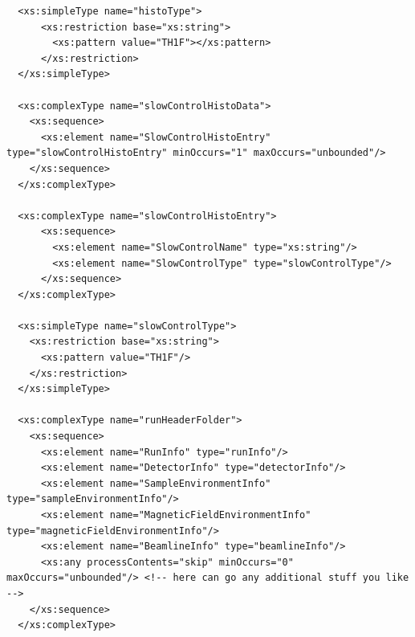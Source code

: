 \documentclass[twoside]{article}
\begin{document}
\begin{shaded}
\begin{small}
\begin{verbatim}
  <xs:simpleType name="histoType">
      <xs:restriction base="xs:string">
        <xs:pattern value="TH1F"></xs:pattern>
      </xs:restriction>
  </xs:simpleType>  
  
  <xs:complexType name="slowControlHistoData">
    <xs:sequence>
      <xs:element name="SlowControlHistoEntry" type="slowControlHistoEntry" minOccurs="1" maxOccurs="unbounded"/>
    </xs:sequence>
  </xs:complexType>

  <xs:complexType name="slowControlHistoEntry">
      <xs:sequence>
        <xs:element name="SlowControlName" type="xs:string"/>
        <xs:element name="SlowControlType" type="slowControlType"/>
      </xs:sequence>
  </xs:complexType>
       
  <xs:simpleType name="slowControlType">
    <xs:restriction base="xs:string">
      <xs:pattern value="TH1F"/>  
    </xs:restriction>  
  </xs:simpleType>  

  <xs:complexType name="runHeaderFolder">
    <xs:sequence>
      <xs:element name="RunInfo" type="runInfo"/>
      <xs:element name="DetectorInfo" type="detectorInfo"/>
      <xs:element name="SampleEnvironmentInfo" type="sampleEnvironmentInfo"/>
      <xs:element name="MagneticFieldEnvironmentInfo" type="magneticFieldEnvironmentInfo"/>
      <xs:element name="BeamlineInfo" type="beamlineInfo"/>
      <xs:any processContents="skip" minOccurs="0" maxOccurs="unbounded"/> <!-- here can go any additional stuff you like -->
    </xs:sequence>
  </xs:complexType>
  

\end{verbatim}
\end{small}
\end{shaded}
\end{document}
